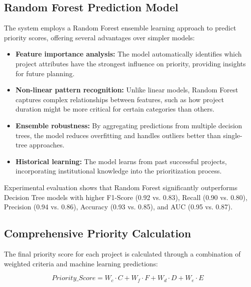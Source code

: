 \documentclass[12pt,a4paper]{report}
\begin{document}
\subsection{Random Forest Prediction Model}
\indent \indent The system employs a Random Forest ensemble learning approach to predict priority scores, offering several advantages over simpler models:

\begin{itemize}
    \item \textbf{Feature importance analysis:} The model automatically identifies which project attributes have the strongest influence on priority, providing insights for future planning.
    
    \item \textbf{Non-linear pattern recognition:} Unlike linear models, Random Forest captures complex relationships between features, such as how project duration might be more critical for certain categories than others.
    
    \item \textbf{Ensemble robustness:} By aggregating predictions from multiple decision trees, the model reduces overfitting and handles outliers better than single-tree approaches.
    
    \item \textbf{Historical learning:} The model learns from past successful projects, incorporating institutional knowledge into the prioritization process.
\end{itemize}

\noindent Experimental evaluation shows that Random Forest significantly outperforms Decision Tree models with higher F1-Score (0.92 vs. 0.83), Recall (0.90 vs. 0.80), Precision (0.94 vs. 0.86), Accuracy (0.93 vs. 0.85), and AUC (0.95 vs. 0.87).

\subsection{Comprehensive Priority Calculation}
\indent \indent The final priority score for each project is calculated through a combination of weighted criteria and machine learning predictions:

\begin{equation}
Priority\_Score = W_c \cdot C + W_f \cdot F + W_d \cdot D + W_e \cdot E
\end{equation}
\end{document}
